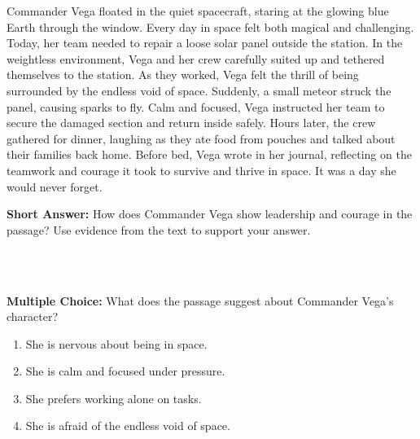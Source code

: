 \documentclass[12pt]{article}
\begin{document}
\begin{tcolorbox}[colframe=black!50, colback=white, title=Passage: A Day in the Life of an Astronaut]
Commander Vega floated in the quiet spacecraft, staring at the glowing blue Earth through the window. Every day in space felt both magical and challenging. Today, her team needed to repair a loose solar panel outside the station. In the weightless environment, Vega and her crew carefully suited up and tethered themselves to the station. As they worked, Vega felt the thrill of being surrounded by the endless void of space. Suddenly, a small meteor struck the panel, causing sparks to fly. Calm and focused, Vega instructed her team to secure the damaged section and return inside safely. Hours later, the crew gathered for dinner, laughing as they ate food from pouches and talked about their families back home. Before bed, Vega wrote in her journal, reflecting on the teamwork and courage it took to survive and thrive in space. It was a day she would never forget.
\end{tcolorbox}

\begin{tcolorbox}[colframe=black!50, colback=white, title=Question 6]
\textbf{Short Answer:} How does Commander Vega show leadership and courage in the passage? Use evidence from the text to support your answer.  

\vspace{2em}
\\[0.8cm] \underline{\hspace{15.8cm}}  
    \\[0.8cm] \underline{\hspace{15.8cm}}  
\end{tcolorbox}

\begin{tcolorbox}[colframe=black!50, colback=white, title=Question 7]
\textbf{Multiple Choice:} What does the passage suggest about Commander Vega’s character?  
\begin{enumerate}[label=(\Alph*)]
\item She is nervous about being in space.  
\item She is calm and focused under pressure.  
\item She prefers working alone on tasks.  
\item She is afraid of the endless void of space.  
\end{enumerate}
\end{tcolorbox}
\end{document}
